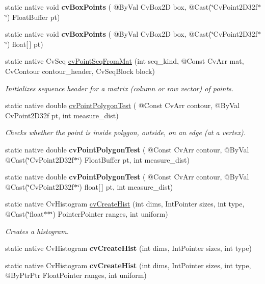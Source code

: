 \begin{DoxyCompactItemize}
static native void {\bfseries cv\+Box\+Points} ( @By\+Val Cv\+Box2D box, @Cast(\char`\"{}Cv\+Point2\+D32f$\ast$\char`\"{}) Float\+Buffer pt)
\item 
static native void {\bfseries cv\+Box\+Points} ( @By\+Val Cv\+Box2D box, @Cast(\char`\"{}Cv\+Point2\+D32f$\ast$\char`\"{}) float\mbox{[}$\,$\mbox{]} pt)
\item 
static native Cv\+Seq \hyperlink{group__imgproc__c_ga75ebb68fece47bfb144af0ad2a86668e}{cv\+Point\+Seq\+From\+Mat} (int seq\+\_\+kind, @Const Cv\+Arr mat, Cv\+Contour contour\+\_\+header, Cv\+Seq\+Block block)
\begin{DoxyCompactList}\small\item\em Initializes sequence header for a matrix (column or row vector) of points. \end{DoxyCompactList}\item 
static native double \hyperlink{group__imgproc__c_ga9702f652ace9af304514bd89286968b5}{cv\+Point\+Polygon\+Test} ( @Const Cv\+Arr contour, @By\+Val Cv\+Point2\+D32f pt, int measure\+\_\+dist)
\begin{DoxyCompactList}\small\item\em Checks whether the point is inside polygon, outside, on an edge (at a vertex). \end{DoxyCompactList}\item 
static native double {\bfseries cv\+Point\+Polygon\+Test} ( @Const Cv\+Arr contour, @By\+Val @Cast(\char`\"{}Cv\+Point2\+D32f$\ast$\char`\"{}) Float\+Buffer pt, int measure\+\_\+dist)
\item 
static native double {\bfseries cv\+Point\+Polygon\+Test} ( @Const Cv\+Arr contour, @By\+Val @Cast(\char`\"{}Cv\+Point2\+D32f$\ast$\char`\"{}) float\mbox{[}$\,$\mbox{]} pt, int measure\+\_\+dist)
\item 
static native Cv\+Histogram \hyperlink{group__imgproc__c_ga35e0a34e834d2b6654992a0116be5253}{cv\+Create\+Hist} (int dims, Int\+Pointer sizes, int type, @Cast(\char`\"{}float$\ast$$\ast$\char`\"{}) Pointer\+Pointer ranges, int uniform)
\begin{DoxyCompactList}\small\item\em Creates a histogram. \end{DoxyCompactList}\item 
static native Cv\+Histogram {\bfseries cv\+Create\+Hist} (int dims, Int\+Pointer sizes, int type)
\item 
static native Cv\+Histogram {\bfseries cv\+Create\+Hist} (int dims, Int\+Pointer sizes, int type, @By\+Ptr\+Ptr Float\+Pointer ranges, int uniform)
$$
\end{DoxyCompactItemize}
